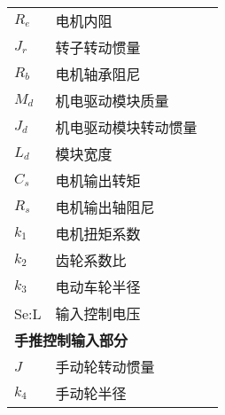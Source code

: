\begin{table}[H]
\begin{longtable}{l|l|l}
		$ R_e $ & 电机内阻 & \\
		$ J_r $ & 转子转动惯量 & \\
		$ R_b $ & 电机轴承阻尼 & \\
		$ M_d $ & 机电驱动模块质量 & \\
		$ J_d $ & 机电驱动模块转动惯量 & \\
		$ L_d $ & 模块宽度 & \\
		$ C_s $ & 电机输出转矩 & \\
		$ R_s $ & 电机输出轴阻尼 & \\
		$ k_1 $ & 电机扭矩系数 & \\ %
		$ k_2 $ & 齿轮系数比 & \\ %
		$ k_3 $ & 电动车轮半径 & \\ %
		Se:L & 输入控制电压\\
		\midrule
		\multicolumn{3}{l}{\textbf{手推控制输入部分}}\\
		\midrule
		$ J $ & 手动轮转动惯量 & \\
		$ k_4 $ & 手动轮半径 & \\ %
		\bottomrule
	\end{longtable}
\end{table}
